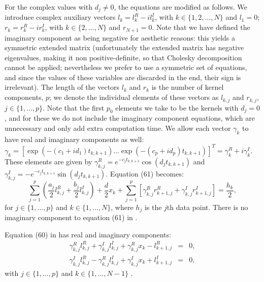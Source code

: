 \documentclass[manuscript, letterpaper]{aastex6}
\begin{document}
For the complex values with $d_j \ne 0$, the equations are modified as follows.  We introduce complex
auxiliary vectors $l_k = l_{k}^R - i l_{k}^I$, with $k \in \{1,2,...,N\}$ and $l_1 = 0$; $r_k =
r_k^R - i r_k^I$, with $k \in \{2,...,N\}$ and $r_{N+1} = 0$.  Note that we have defined the
imaginary component as being negative for aesthetic reasons:  this yields a symmetric extended
matrix (unfortunately the extended matrix has negative eigenvalues, making it non positive-definite,
so that Cholesky decomposition cannot be applied; nevertheless we prefer to use a symmetric
set of equations, and since the values of these variables are discarded in the end, their sign
is irrelevant).  The length of the vectors $l_k$ and $r_k$
is the number of kernel components, $p$;  we denote the individual elements of these vectors
as $l_{k,j}$ and $r_{k,j}$, $j \in \{1,...,p\}$.  Note that the first $p_0$ elements we take
to be the kernels with $d_j=0$, and for these we do not include the imaginary component
equations, which are unnecessary and only add extra computation time.  We allow each vector $\gamma_k$ to have real and imaginary
components as well:  $\gamma_k = \left[\exp{(-(c_1+id_1) t_{k,k+1})} ... \exp{(-(c_p+id_p) t_{k,k+1})}\right]^T
 = \gamma_k^R + i \gamma_k^I.$  These elements are given by $\gamma_{k,j}^R = e^{-c_j t_{k,k+1}}
\cos{(d_j t_{k,k+1})}$ and $\gamma_{k,j}^I = -e^{-c_j t_{k,k+1}}\sin{(d_j t_{k,k+1})}$.
Equation (61) becomes:
\begin{equation} \label{Amb61}
\sum_{j=1}^p \left(\frac{a_j}{2} l_{k,j}^R +\frac{b_j}{2} l_{k,j}^I\right)+ \frac{d}{2} x_k + \sum_{j=1}^p \left[
\gamma_{k,j}^R r_{k+1,j}^R + \gamma_{k,j}^I r_{k+1,j}^I\right] = \frac{h_k}{2},
\end{equation}
for $j \in \{1,...,p\}$ and $k \in \{1,...,N\}$, where $h_j$ is the $j$th data point.  There is no imaginary component to equation (61)
in \citet{Ambikasaran:2015}.

Equation (60) in \citet{Ambikasaran:2015} has real and imaginary components:
\begin{eqnarray} \label{Amb60}
\gamma_{k,j}^R l_{k,j}^R +\gamma_{k,j}^I l_{k,j}^I + \gamma_{k,j}^R x_k - l_{k+1,j}^R &=& 0,\\
\gamma_{k,j}^I l_{k,j}^R -\gamma_{k,j}^R l_{k,j}^I + \gamma_{k,j}^I x_k + l_{k+1,j}^I &=& 0,
\end{eqnarray}
with $j \in \{1,...,p\}$ and $k \in \{1,...,N-1\}$
\citep[note that we have shifted the indices of this equation by one from the indexing using in][]{Ambikasaran:2015}.
\end{document}
